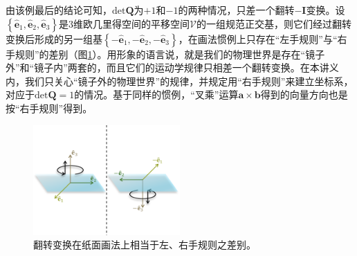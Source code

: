\documentclass[../main.tex]{subfiles}
\begin{document}
由该例最后的结论可知，$\mathrm{det}\mathbf{Q}$为$+1$和$-1$的两种情况，只差一个翻转$-\mathbf{I}$变换。设$\left\{\mathbf{\hat{e}}_1,\mathbf{\hat{e}}_2,\mathbf{\hat{e}}_3\right\}$是3维欧几里得空间的平移空间$\mathcal{V}$的一组规范正交基，则它们经过翻转变换后形成的另一组基$\left\{-\mathbf{\hat{e}}_1,-\mathbf{\hat{e}}_2,-\mathbf{\hat{e}}_3\right\}$，在画法惯例上只存在“左手规则”与“右手规则”的差别（图\ref{fig:II.3.3}）。用形象的语言说，就是我们的物理世界是存在“镜子外”和“镜子内”两套的，而且它们的运动学规律只相差一个翻转变换。在本讲义内，我们只关心“镜子外的物理世界”的规律，并规定用“右手规则”来建立坐标系，对应于$\mathrm{det}\mathbf{Q}=1$的情况。基于同样的惯例，“叉乘”运算$\mathbf{a}\times\mathbf{b}$得到的向量方向也是按“右手规则”得到。

\begin{figure}[ht]
    \centering
    \includegraphics[width=0.5\textwidth]{images/II.3.3.pdf}
    \caption{翻转变换在纸面画法上相当于左、右手规则之差别。}
    \label{fig:II.3.3}
\end{figure}
\end{document}
